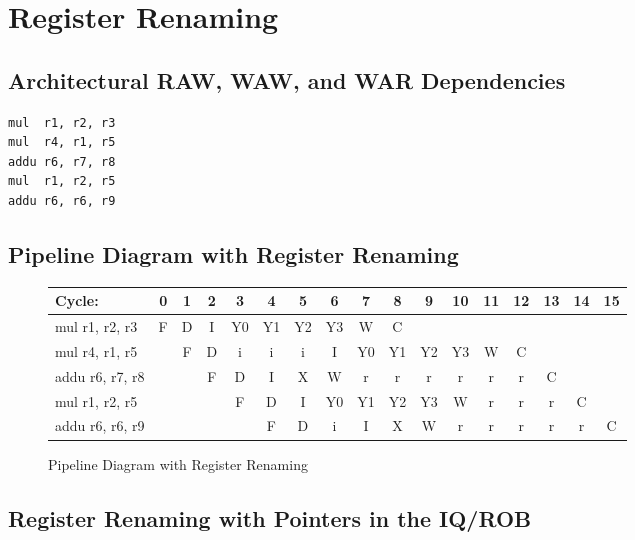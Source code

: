 \documentclass[10pt]{article}
\begin{document}
\cleardoublepage
\section{Register Renaming}

\subsection{Architectural RAW, WAW, and WAR Dependencies}

\begin{lstlisting}
mul  r1, r2, r3
mul  r4, r1, r5
addu r6, r7, r8
mul  r1, r2, r5
addu r6, r6, r9
\end{lstlisting}

\subsection{Pipeline Diagram with Register Renaming}

\begin{figure}[H]
\centering
{\setlength{\tabcolsep}{2pt}
\begin{tabular}{|l|c|c|c|c|c|c|c|c|c|c|c|c|c|c|c|c|}
\hline
Cycle:            & 0 & 1 & 2 & 3 & 4 & 5 & 6 & 7 & 8 & 9 & 10 & 11 & 12 & 13 & 14 & 15 \\ \hline
mul  r1, r2, r3   & F & D & I & Y0& Y1& Y2& Y3& W & C &   &    &    &    &    &    &    \\ \hline
mul  r4, r1, r5   &   & F & D & i & i & i & I & Y0& Y1& Y2& Y3 & W  & C  &    &    &    \\ \hline
addu r6, r7, r8   &   &   & F & D & I & X & W & r & r & r & r  & r  & r  & C  &    &    \\ \hline
mul  r1, r2, r5   &   &   &   & F & D & I & Y0& Y1& Y2& Y3& W  & r  & r  & r  & C  &    \\ \hline
addu r6, r6, r9   &   &   &   &   & F & D & i & I & X & W & r  & r  & r  & r  & r  & C  \\ \hline
\end{tabular}
}
\caption{Pipeline Diagram with Register Renaming}
\end{figure}

\subsection{Register Renaming with Pointers in the IQ/ROB}
\end{document}
